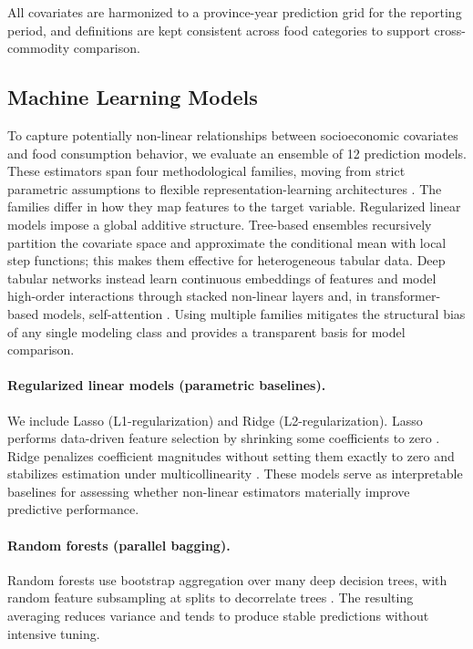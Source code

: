 \documentclass[12pt,a4paper]{article}
\begin{document}
All covariates are harmonized to a province-year prediction grid for the reporting period, and definitions are kept consistent across food categories to support cross-commodity comparison.

\subsection{Machine Learning Models}
\label{sec:models}

To capture potentially non-linear relationships between socioeconomic covariates and food consumption behavior, we evaluate an ensemble of 12 prediction models. These estimators span four methodological families, moving from strict parametric assumptions to flexible representation-learning architectures \citep{AtheyImbens2019}. The families differ in how they map features to the target variable. Regularized linear models impose a global additive structure. Tree-based ensembles recursively partition the covariate space and approximate the conditional mean with local step functions; this makes them effective for heterogeneous tabular data. Deep tabular networks instead learn continuous embeddings of features and model high-order interactions through stacked non-linear layers and, in transformer-based models, self-attention \citep{Goodfellow2016, Gorishniy2021FTTransformer}. Using multiple families mitigates the structural bias of any single modeling class and provides a transparent basis for model comparison.

\paragraph{Regularized linear models (parametric baselines).}
We include Lasso (L1-regularization) and Ridge (L2-regularization). Lasso performs data-driven feature selection by shrinking some coefficients to zero \citep{Tibshirani1996Lasso}. Ridge penalizes coefficient magnitudes without setting them exactly to zero and stabilizes estimation under multicollinearity \citep{Hoerl1970Ridge}. These models serve as interpretable baselines for assessing whether non-linear estimators materially improve predictive performance.

\paragraph{Random forests (parallel bagging).}
Random forests use bootstrap aggregation over many deep decision trees, with random feature subsampling at splits to decorrelate trees \citep{Breiman2001RF}. The resulting averaging reduces variance and tends to produce stable predictions without intensive tuning.
\end{document}
